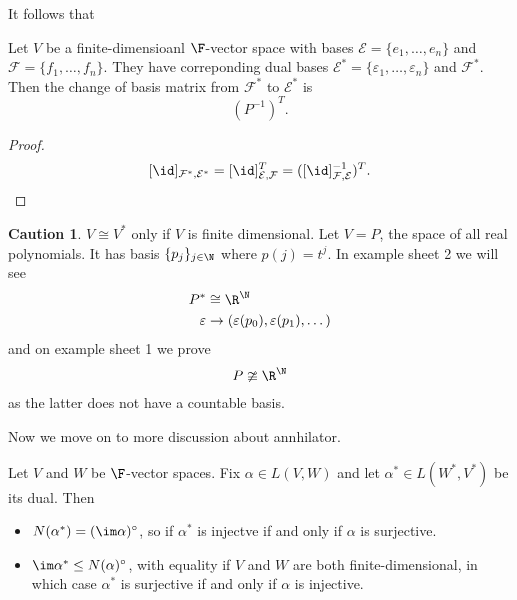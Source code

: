 \documentclass[a4paper]{article}
\newcommand*{\ann}{\circ}
\newcommand*{\basis}{\mathcal}
\theoremstyle{definition}
\newtheorem*{caution}{Caution}
\begin{document}
It follows that
\begin{lemma}
  Let \(V\) be a finite-dimensioanl \(\F\)-vector space with bases \(\basis E = \{e_1,\dots,e_n\}\) and \(\basis F = \{f_1,\dots,f_n\}\). They have correponding dual bases \(\basis E^* = \{\varepsilon_1,\dots, \varepsilon_n\}\) and \(\basis F^*\). Then the change of basis matrix from \(\basis F^*\) to \(\basis E^*\) is
  \[
    (P^{-1})^T.
  \]
\end{lemma}

\begin{proof}
  \[
    [\id]_{\basis F^*,\basis E^*} = [\id]_{\basis E, \basis F}^T = ([\id]_{\basis F, \basis E}^{-1})^T.
  \]
\end{proof}

\begin{caution}
  \(V \cong V^*\) only if \(V\) is finite dimensional. Let \(V = P\), the space of all real polynomials. It has basis \(\{p_j\}_{j\in \N}\) where \(p(j) = t^j\). In example sheet 2 we will see
\begin{align*}
  P^* &\cong \R^\N \\
  \varepsilon &\to (\varepsilon(p_0), \varepsilon(p_1), \dots)
\end{align*}
and on example sheet 1 we prove
\[
  P \ncong \R^\N
\]
as the latter does not have a countable basis.
\end{caution}

Now we move on to more discussion about annhilator.

\begin{lemma}
  Let \(V\) and \(W\) be \(\F\)-vector spaces. Fix \(\alpha \in L(V,W)\) and let \(\alpha^* \in L(W^*, V^*)\) be its dual. Then
  \begin{itemize}
  \item \(N(\alpha^*) = (\im \alpha)^\ann\), so if \(\alpha^*\) is injectve if and only if \(\alpha\) is surjective.
  \item \(\im \alpha^* \leq N(\alpha)^\ann\), with equality if \(V\) and \(W\) are both finite-dimensional, in which case \(\alpha^*\) is surjective if and only if \(\alpha\) is injective.
  \end{itemize}
\end{lemma}
\end{document}
